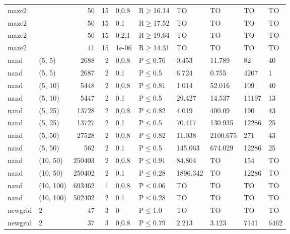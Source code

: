 \begin{longtable}{llrrllllll}
 maze2         &           &     	50 &   15 & 0,0.8 & R$\geq$16.14 & TO       & TO       & TO      & TO      \\
 maze2         &           &     	50 &   15 & 0.1   & R$\geq$17.52 & TO       & TO       & TO      & TO      \\
 maze2         &           &     	50 &   15 & 0.2,1 & R$\geq$19.64 & TO       & TO       & TO      & TO      \\
 maze2         &           &     	41 &   15 & 1e-06 & R$\geq$14.31 & TO       & TO       & TO      & TO      \\
 nand          & (5, 5)    &   	2688 &    2 & 0,0.8 & P$\leq$0.76  & 0.453    & 11.789   & 82      & 40      \\
 nand          & (5, 5)    &   	2687 &    2 & 0.1   & P$\leq$0.5   & 6.724    & 0.755    & 4207    & 1       \\
 nand          & (5, 10)   &   	5448 &    2 & 0,0.8 & P$\leq$0.81  & 1.014    & 52.016   & 109     & 40      \\
 nand          & (5, 10)   &   	5447 &    2 & 0.1   & P$\leq$0.5   & 29.427   & 14.537   & 11197   & 13      \\
 nand          & (5, 25)   &  	13728 &    2 & 0,0.8 & P$\leq$0.82  & 4.019    & 400.09   & 190     & 43      \\
 nand          & (5, 25)   &  	13727 &    2 & 0.1   & P$\leq$0.5   & 70.417   & 130.935  & 12286   & 25      \\
 nand          & (5, 50)   &  	27528 &    2 & 0,0.8 & P$\leq$0.82  & 11.038   & 2100.675 & 271     & 43      \\
 nand          & (5, 50)   &    	562 &    2 & 0.1   & P$\leq$0.5   & 145.063  & 674.029  & 12286   & 25      \\
 nand          & (10, 50)  & 	250403 &    2 & 0,0.8 & P$\leq$0.91  & 84.804   & TO       & 154     & TO      \\
 nand          & (10, 50)  & 	250402 &    2 & 0.1   & P$\leq$0.28  & 1896.342 & TO       & 12286   & TO      \\
 nand          & (10, 100) & 	693462 &    1 & 0,0.8 & P$\leq$0.06  & TO       & TO       & TO      & TO      \\
 nand          & (10, 100) & 	502402 &    2 & 0.1   & P$\leq$0.28  & TO       & TO       & TO      & TO      \\
 newgrid       & 2         &     	47 &    3 & 0     & P$\leq$1.0   & TO       & TO       & TO      & TO      \\
 newgrid       & 2         &     	37 &    3 & 0,0.8 & P$\leq$0.79  & 2.213    & 3.123    & 7141    & 6462    \\

\end{longtable}
